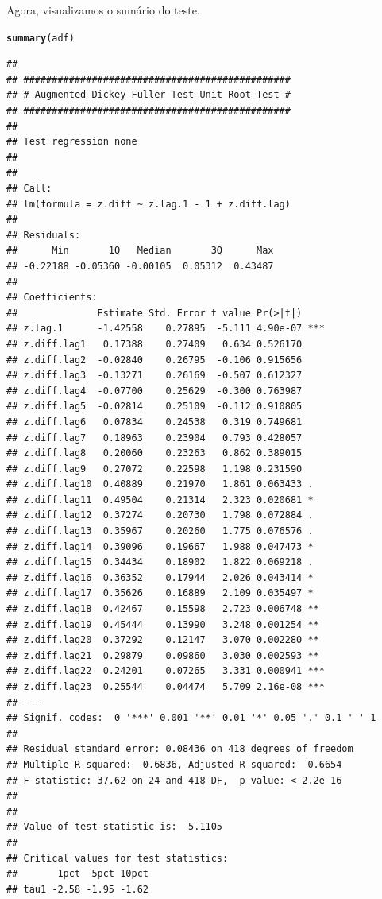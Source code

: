 \documentclass{article}\usepackage[]{graphicx}\usepackage[]{color}
\makeatletter
\newcommand{\hlstd}[1]{\textcolor[rgb]{0.345,0.345,0.345}{#1}}%
\newcommand{\hlkwd}[1]{\textcolor[rgb]{0.737,0.353,0.396}{\textbf{#1}}}%
\newenvironment{kframe}{%
 \def\at@end@of@kframe{}%
 \ifinner\ifhmode%
  \def\at@end@of@kframe{\end{minipage}}%
  \begin{minipage}{\columnwidth}%
 \fi\fi%
 \def\FrameCommand##1{\hskip\@totalleftmargin \hskip-\fboxsep
 \colorbox{shadecolor}{##1}\hskip-\fboxsep
     \hskip-\linewidth \hskip-\@totalleftmargin \hskip\columnwidth}%
 \MakeFramed {\advance\hsize-\width
   \@totalleftmargin\z@ \linewidth\hsize
   \@setminipage}}%
 {\par\unskip\endMakeFramed%
 \at@end@of@kframe}
\newenvironment{knitrout}{}{} %
\makeatother
\begin{document}
            Agora, visualizamos o sumário do teste.

\begin{knitrout}
\color{fgcolor}\begin{kframe}
\begin{alltt}
\hlkwd{summary}\hlstd{(adf)}
\end{alltt}
\begin{verbatim}
## 
## ############################################### 
## # Augmented Dickey-Fuller Test Unit Root Test # 
## ############################################### 
## 
## Test regression none 
## 
## 
## Call:
## lm(formula = z.diff ~ z.lag.1 - 1 + z.diff.lag)
## 
## Residuals:
##      Min       1Q   Median       3Q      Max 
## -0.22188 -0.05360 -0.00105  0.05312  0.43487 
## 
## Coefficients:
##              Estimate Std. Error t value Pr(>|t|)    
## z.lag.1      -1.42558    0.27895  -5.111 4.90e-07 ***
## z.diff.lag1   0.17388    0.27409   0.634 0.526170    
## z.diff.lag2  -0.02840    0.26795  -0.106 0.915656    
## z.diff.lag3  -0.13271    0.26169  -0.507 0.612327    
## z.diff.lag4  -0.07700    0.25629  -0.300 0.763987    
## z.diff.lag5  -0.02814    0.25109  -0.112 0.910805    
## z.diff.lag6   0.07834    0.24538   0.319 0.749681    
## z.diff.lag7   0.18963    0.23904   0.793 0.428057    
## z.diff.lag8   0.20060    0.23263   0.862 0.389015    
## z.diff.lag9   0.27072    0.22598   1.198 0.231590    
## z.diff.lag10  0.40889    0.21970   1.861 0.063433 .  
## z.diff.lag11  0.49504    0.21314   2.323 0.020681 *  
## z.diff.lag12  0.37274    0.20730   1.798 0.072884 .  
## z.diff.lag13  0.35967    0.20260   1.775 0.076576 .  
## z.diff.lag14  0.39096    0.19667   1.988 0.047473 *  
## z.diff.lag15  0.34434    0.18902   1.822 0.069218 .  
## z.diff.lag16  0.36352    0.17944   2.026 0.043414 *  
## z.diff.lag17  0.35626    0.16889   2.109 0.035497 *  
## z.diff.lag18  0.42467    0.15598   2.723 0.006748 ** 
## z.diff.lag19  0.45444    0.13990   3.248 0.001254 ** 
## z.diff.lag20  0.37292    0.12147   3.070 0.002280 ** 
## z.diff.lag21  0.29879    0.09860   3.030 0.002593 ** 
## z.diff.lag22  0.24201    0.07265   3.331 0.000941 ***
## z.diff.lag23  0.25544    0.04474   5.709 2.16e-08 ***
## ---
## Signif. codes:  0 '***' 0.001 '**' 0.01 '*' 0.05 '.' 0.1 ' ' 1
## 
## Residual standard error: 0.08436 on 418 degrees of freedom
## Multiple R-squared:  0.6836,	Adjusted R-squared:  0.6654 
## F-statistic: 37.62 on 24 and 418 DF,  p-value: < 2.2e-16
## 
## 
## Value of test-statistic is: -5.1105 
## 
## Critical values for test statistics: 
##       1pct  5pct 10pct
## tau1 -2.58 -1.95 -1.62
\end{verbatim}
\end{kframe}
\end{knitrout}
            
\end{document}
